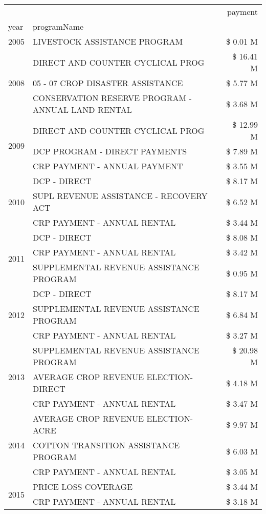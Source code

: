 \begin{tabular}{llr}
\toprule
 &  & payment \\
year & programName &  \\
\midrule
2005 & LIVESTOCK ASSISTANCE PROGRAM & \$ 0.01 M \\
\cline{1-3}
\multirow[t]{3}{*}{2008} & DIRECT AND COUNTER CYCLICAL PROG & \$ 16.41 M \\
 & 05 - 07 CROP DISASTER ASSISTANCE & \$ 5.77 M \\
 & CONSERVATION RESERVE PROGRAM - ANNUAL LAND RENTAL & \$ 3.68 M \\
\cline{1-3}
\multirow[t]{3}{*}{2009} & DIRECT AND COUNTER CYCLICAL PROG & \$ 12.99 M \\
 & DCP PROGRAM - DIRECT PAYMENTS & \$ 7.89 M \\
 & CRP PAYMENT - ANNUAL PAYMENT & \$ 3.55 M \\
\cline{1-3}
\multirow[t]{3}{*}{2010} & DCP - DIRECT & \$ 8.17 M \\
 & SUPL REVENUE ASSISTANCE - RECOVERY ACT & \$ 6.52 M \\
 & CRP PAYMENT - ANNUAL RENTAL & \$ 3.44 M \\
\cline{1-3}
\multirow[t]{3}{*}{2011} & DCP - DIRECT & \$ 8.08 M \\
 & CRP PAYMENT - ANNUAL RENTAL & \$ 3.42 M \\
 & SUPPLEMENTAL REVENUE ASSISTANCE PROGRAM & \$ 0.95 M \\
\cline{1-3}
\multirow[t]{3}{*}{2012} & DCP - DIRECT & \$ 8.17 M \\
 & SUPPLEMENTAL REVENUE ASSISTANCE PROGRAM & \$ 6.84 M \\
 & CRP PAYMENT - ANNUAL RENTAL & \$ 3.27 M \\
\cline{1-3}
\multirow[t]{3}{*}{2013} & SUPPLEMENTAL REVENUE ASSISTANCE PROGRAM & \$ 20.98 M \\
 & AVERAGE CROP REVENUE ELECTION-DIRECT & \$ 4.18 M \\
 & CRP PAYMENT - ANNUAL RENTAL & \$ 3.47 M \\
\cline{1-3}
\multirow[t]{3}{*}{2014} & AVERAGE CROP REVENUE ELECTION-ACRE & \$ 9.97 M \\
 & COTTON TRANSITION ASSISTANCE PROGRAM & \$ 6.03 M \\
 & CRP PAYMENT - ANNUAL RENTAL & \$ 3.05 M \\
\cline{1-3}
\multirow[t]{3}{*}{2015} & PRICE LOSS COVERAGE & \$ 3.44 M \\
 & CRP PAYMENT - ANNUAL RENTAL & \$ 3.18 M \\

\end{tabular}
